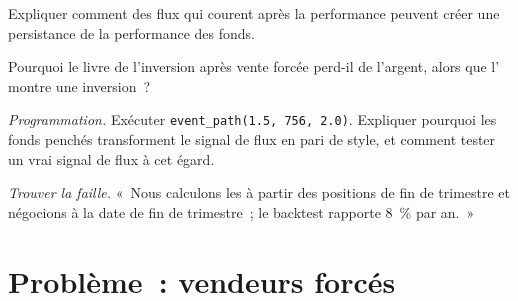 \begin{exercise}[$\star\star$]\label{exo:s1:flows:5}
Expliquer comment des flux qui courent après la performance peuvent créer une persistance de la performance des fonds.
\end{exercise}

\begin{exercise}[$\star\star$]\label{exo:s1:flows:6}
Pourquoi le livre de l'inversion après vente forcée perd-il de l'argent, alors que l' montre une inversion~?
\end{exercise}

\begin{exercise}[$\star\star\star$]\label{exo:s1:flows:7}
\emph{Programmation.} Exécuter \texttt{event\_path(1.5, 756, 2.0)}. Expliquer pourquoi les fonds penchés transforment le signal de flux en pari de style, et comment tester un vrai signal de flux
à cet égard.
\end{exercise}

\begin{exercise}[$\star\star\star$]\label{exo:s1:flows:8}
\emph{Trouver la faille.} «~Nous calculons les  à partir des positions de fin de trimestre et négocions à la date de fin de trimestre~; le backtest rapporte 8~\% par an.~»
\end{exercise}

\section{Problème~: vendeurs forcés}

